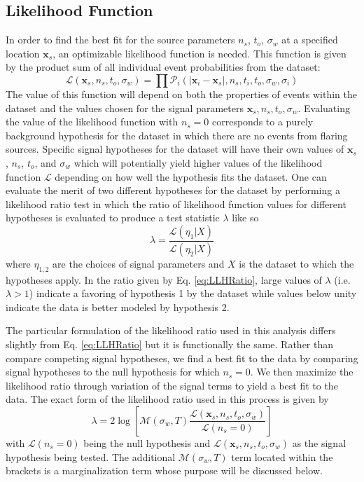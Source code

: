 \documentclass{gatech-thesis}
\begin{document}
\subsection{Likelihood Function}
In order to find the best fit for the source parameters $n_s$, $t_o$, $\sigma_w$ at a specified location $\mathbf{x}_s$, an optimizable likelihood function is needed. This function is given by the product sum of all individual event probabilities from the dataset:
\begin{equation}\label{eq:LLH}
\mathcal{L}(\mathbf{x}_s,n_s,t_o,\sigma_w) = \prod \mathcal{P}_i(|\mathbf{x}_i-\mathbf{x}_s|,n_s,t_i,t_o,\sigma_w,\sigma_i)
\end{equation}
The value of this function will depend on both the properties of events within the dataset and the values chosen for the signal parameters $\mathbf{x}_s,n_s,t_o,\sigma_w$. Evaluating the value of the likelihood function with $n_s=0$ corresponds to a purely background hypothesis for the dataset in which there are no events from flaring sources. Specific signal hypotheses for the dataset will have their own values of $\mathbf{x}_s$, $n_s$, $t_o$, and $\sigma_w$ which will potentially yield higher values of the likelihood function $\mathcal{L}$ depending on how well the hypothesis fits the dataset. One can evaluate the merit of two different hypotheses for the dataset by performing a likelihood ratio test in which the ratio of likelihood function values for different hypotheses is evaluated to produce a test statistic $\lambda$ like so
\begin{equation}\label{eq:LLHRatio}
\mathcal{\lambda} = \frac{\mathcal{L}(\eta_1 | X)}{\mathcal{L}(\eta_2 | X)}
\end{equation}
where $\eta_{1,2}$ are the choices of signal parameters and $X$ is the dataset to which the hypotheses apply. In the ratio given by Eq. \ref{eq:LLHRatio}, large values of $\lambda$ (i.e. $\lambda>1$) indicate a favoring of hypothesis 1 by the dataset while values below unity indicate the data is better modeled by hypothesis 2.

The particular formulation of the likelihood ratio used in this analysis differs slightly from Eq. \ref{eq:LLHRatio} but it is functionally the same. Rather than compare competing signal hypotheses, we find a best fit to the data by comparing signal hypotheses to the null hypothesis for which $n_s=0$. We then maximize the likelihood ratio through variation of the signal terms to yield a best fit to the data. The exact form of the likelihood ratio used in this process is given by
\begin{equation}\label{eq:unmaxedts}
\lambda = 2\log \left[\mathcal{M}(\sigma_w,T)\frac{\mathcal{L}(\mathbf{x}_s,n_s,t_o,\sigma_w)}{\mathcal{L}(n_s = 0)} \right]
\end{equation}
with $\mathcal{L}(n_s = 0)$ being the null hypothesis and $\mathcal{L}(\mathbf{x}_s,n_s,t_o,\sigma_w)$ as the signal hypothesis being tested. The additional $\mathcal{M}(\sigma_w,T)$ term located within the brackets is a marginalization term whose purpose will be discussed below.
\end{document}
